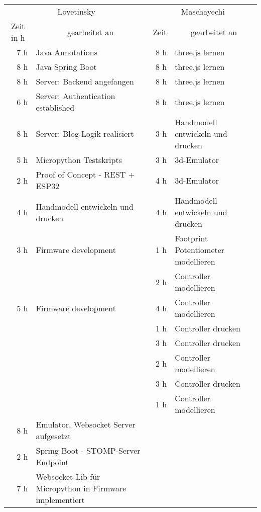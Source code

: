 \begin{table}[htbp]
  \centering
    \begin{tabular}{|r|l|r|l|}
    \hline
    \multicolumn{2}{|c|}{Lovetinsky} & \multicolumn{2}{c|}{Maschayechi} \\
    \multicolumn{1}{|c|}{Zeit in h} & \multicolumn{1}{c|}{gearbeitet an} & \multicolumn{1}{c|}{Zeit} & \multicolumn{1}{c|}{gearbeitet an} \\
    7 h   & Java Annotations & 8 h   & three.js lernen \\
    8 h   & Java Spring Boot & 8 h   & three.js lernen \\
    8 h   & Server: Backend angefangen & 8 h   & three.js lernen \\
    \hline
    6 h   & Server: Authentication established & 8 h   & three.js lernen \\
    \hline
    8 h   & Server: Blog-Logik realisiert & 3 h   & Handmodell entwickeln und drucken \\
    \hline
    5 h   & Micropython Testskripts & 3 h   & 3d-Emulator \\
    \hline
    2 h   & Proof of Concept - REST + ESP32 & 4 h   & 3d-Emulator \\
    \hline
    4 h   & Handmodell entwickeln und drucken & 4 h   & Handmodell entwickeln und drucken \\
    \hline
    3 h   & Firmware development & 1 h   & Footprint Potentiometer modellieren \\
    \hline
          &       & 2 h   & Controller modellieren \\
    \hline
    5 h   & Firmware development & 4 h   & Controller modellieren \\
    \hline
          &       & 1 h   & Controller drucken \\
    \hline
          &       & 3 h   & Controller drucken \\
    \hline
          &       & 2 h   & Controller modellieren \\
    \hline
          &       & 3 h   & Controller drucken \\
    \hline
          &       & 1 h   & Controller modellieren \\
    \hline
    8 h   & Emulator, Websocket Server aufgesetzt &       &  \\
    \hline
    2 h   & Spring Boot - STOMP-Server Endpoint &       &  \\
    \hline
    7 h   & Websocket-Lib für Micropython in Firmware implementiert &       &  \\

\end{tabular}
\end{table}
